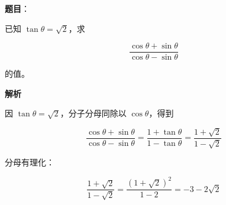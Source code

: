 


\begin{answer}

\textbf{题目}：

已知 $\tan\theta=\sqrt2$，求

\nopagebreak[4]
\[
\frac{\cos\theta+\sin\theta}{\cos\theta-\sin\theta}
\]

的值。

\textbf{解析}

因 $\tan\theta=\sqrt2$，分子分母同除以 $\cos\theta$，得到

\nopagebreak[4]
\[
\frac{\cos\theta+\sin\theta}{\cos\theta-\sin\theta}
=\frac{1+\tan\theta}{1-\tan\theta}
=\frac{1+\sqrt2}{1-\sqrt2}
\]

分母有理化：

\nopagebreak[4]
\[
\frac{1+\sqrt2}{1-\sqrt2}
=\frac{(1+\sqrt2)^2}{1-2}
=-3-2\sqrt2
\]


\end{answer}
